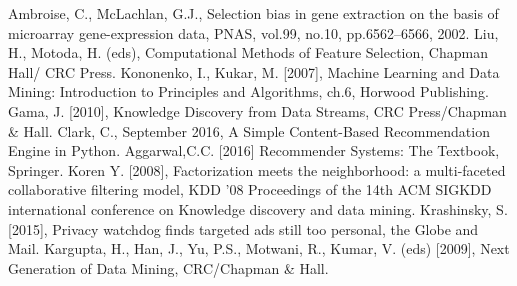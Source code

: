 \begin{thebibliography}{99}
 Ambroise, C., McLachlan, G.J., Selection bias in gene extraction on the basis of microarray gene-expression data, PNAS, vol.99, no.10, pp.6562–6566, 2002.
Liu, H., Motoda, H. (eds), Computational Methods of Feature Selection, Chapman Hall/ CRC Press.
 Kononenko, I., Kukar, M. [2007], Machine Learning and Data Mining: Introduction to Principles and Algorithms, ch.6, Horwood Publishing.
  
  
 Gama, J. [2010], Knowledge Discovery from Data Streams, CRC Press/Chapman \& Hall.
  Clark, C., September 2016, A Simple Content-Based Recommendation Engine in Python.
 Aggarwal,C.C. [2016] Recommender Systems: The Textbook, Springer. 
 Koren Y. [2008], Factorization meets the neighborhood: a multi-faceted collaborative filtering model, KDD '08 Proceedings of the 14th ACM SIGKDD international conference on Knowledge discovery and data mining. 
 Krashinsky, S. [2015], Privacy watchdog finds targeted ads still too personal, the Globe and Mail.
 Kargupta, H., Han, J., Yu, P.S., Motwani, R., Kumar, V. (eds) [2009], Next Generation of Data Mining, CRC/Chapman \& Hall.  

\end{thebibliography}